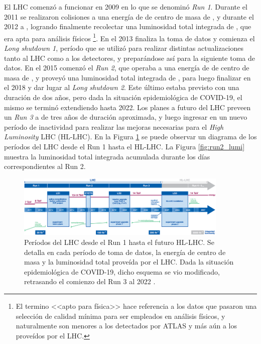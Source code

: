 El LHC comenzó a funcionar en 2009 en lo que se denominó \textit{Run 1}. Durante el 2011 se realizaron colisiones a una energía de de centro de masa de , y durante el 2012 a , logrando finalmente recolectar una luminosidad total integrada de  \cite{DAPR-2011-01,DAPR-2013-01}, que era apta para análisis físicos \footnote{El termino <<apto para física>> hace referencia a los datos que pasaron una selección de calidad mínima para ser empleados en análisis físicos, y naturalmente son menores a los detectados por ATLAS y más aún a los proveídos por el LHC.}. En el 2013 finaliza la toma de datos y comienza el \textit{Long shutdown 1}, período que se utilizó para realizar distintas actualizaciones tanto al LHC como a los detectores, y preparándose así para la siguiente toma de datos. En el 2015 comenzó el \textit{Run 2}, que operaba a una energía de de centro de masa de , y proveyó una luminosidad total integrada de  \cite{lumi_13tev}, para luego finalizar en el 2018 y dar lugar al \textit{Long shutdown 2}. Este último estaba previsto con una duración de dos años, pero dada la situación epidemiológica de COVID-19, el mismo se terminó extendiendo hasta 2022.
Los planes a futuro del LHC preveen un \textit{Run 3} a  de tres años de duración aproximada, y luego ingresar en un nuevo período de inactividad para realizar las mejoras necesarias para el \textit{High Luminosity} LHC (HL-LHC). En la Figura \ref{fig:lhc_periods} se puede observar un diagrama de los períodos del LHC desde el Run 1 hasta el HL-LHC. La Figura \ref{fig:run2_lumi} muestra la luminosidad total integrada acumulada durante los días correspondientes al Run 2.

\begin{figure}
  \centering
  \includegraphics[width=0.9\textwidth]{images/lhc/lhc_periods.png}
  \caption{Períodos del LHC desde el Run 1 hasta el futuro HL-LHC. Se detalla en cada período de toma de datos, la energía de centro de masa y la luminosidad total proveída por el LHC. Dada la situación epidemiológica de COVID-19, dicho esquema se vio modificado, retrasando el comienzo del Run 3 al 2022 \cite{lhc_periods}.}
  \label{fig:lhc_periods}
\end{figure}

